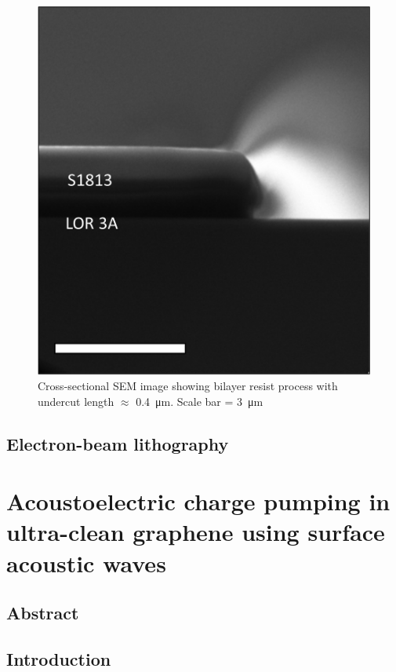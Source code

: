 \documentclass[double,12pt,1in]{beavtex}
\begin{document}
\begin{figure}
    \includegraphics{LOR cross section.png}
    \caption{Cross-sectional SEM image showing bilayer resist process with undercut length $\approx$ \SI{0.4}{\micro\meter}. Scale bar = \SI{3}{\micro\meter}}
    \label{fig:cross-section SEM}
\end{figure}

\section{Electron-beam lithography}

\chapter{Acoustoelectric charge pumping in ultra-clean graphene using surface acoustic waves} \label{AE charge pumping paper}

\section{Abstract}

\section{Introduction} 
\end{document}
